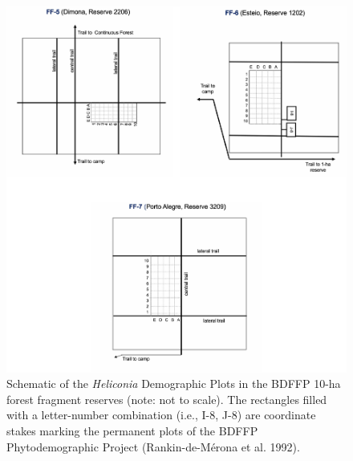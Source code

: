 \documentclass[
  12pt,
  man, donotrepeattitle,floatsintext]{apa6}
\begin{document}
\newpage
\begin{figure}[h]

{\centering \includegraphics{Bruna_etal_MetadataS1_files/figure-latex/plotsten-1} 

}

\caption{Schematic of the \textit{Heliconia} Demographic Plots in the BDFFP 10-ha forest fragment reserves (note: not to scale). The rectangles filled with a letter-number combination (i.e., I-8, J-8) are coordinate stakes marking the permanent plots of the BDFFP Phytodemographic Project (Rankin-de-Mérona et al. 1992).}\label{fig:plotsten}
\end{figure}

\newpage
\end{document}
